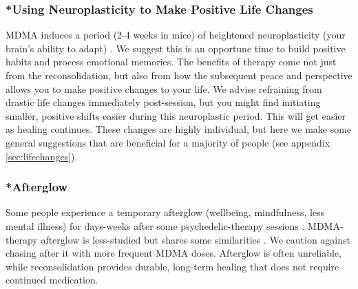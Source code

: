 \documentclass[12pt,letterpaper]{article}
\begin{document}
\subsubsection{*Using Neuroplasticity to Make Positive Life Changes}
MDMA induces a period (2-4 weeks in mice) of heightened neuroplasticity (your brain's ability to adapt) \cite{nardouMDMAPlasticity,nardou2023psychedelics}.  We suggest this is an opportune time to build positive habits and process emotional memories. The benefits of therapy come not just from the reconsolidation, but also from how the subsequent peace and perspective allows you to make positive changes to your life. We advise refraining from drastic life changes immediately post-session, but you might find initiating smaller, positive shifts easier during this neuroplastic period. This will get easier as healing continues. These changes are highly individual, but here we make some general suggestions that are beneficial for a majority of people (see appendix \ref{sec:lifechanges}).

\subsubsection{*Afterglow}
Some people experience a temporary afterglow (wellbeing, mindfulness, less mental illness) for days-weeks after some psychedelic-therapy sessions \cite{evansAfterglow}. MDMA-therapy afterglow is less-studied but shares some similarities \cite{sessaAfterglow}. We caution against chasing after it with more frequent MDMA doses. Afterglow is often unreliable, while reconsolidation provides durable, long-term healing that does not require continued medication.
\end{document}
